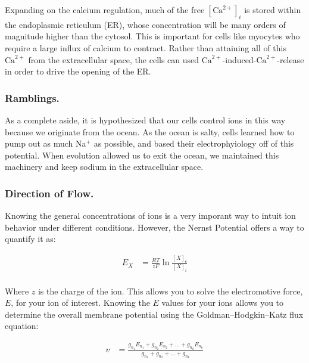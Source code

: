 Expanding on the calcium regulation, much of the free $[\mathrm{Ca}^{2+}]_i$ is stored within the endoplasmic reticulum (ER), whose concentration will be many orders of magnitude higher than the cytosol. This is important for cells like myocytes who require a large influx of calcium to contract. Rather than attaining all of this $\mathrm{Ca}^{2+}$ from the extracellular space, the cells can used $\mathrm{Ca}^{2+}$-induced-$\mathrm{Ca}^{2+}$-release in order to drive the opening of the ER.

\subsubsection{Ramblings.}

As a complete aside, it is hypothesized that our cells control ions in this way because we originate from the ocean. As the ocean is salty, cells learned how to pump out as much Na$^+$ as possible, and based their electrophyiology off of this potential. When evolution allowed us to exit the ocean, we maintained this machinery and keep sodium in the extracellular space. 

\subsubsection{Direction of Flow.}

Knowing the general concentrations of ions is a very imporant way to intuit ion behavior under different conditions. However, the Nernst Potential offers a way to quantify it as: 

\begin{equation} \label{Nernst1}
\begin{split}
E_X &= \frac{RT}{zF}\ln\frac{[X]_e}{[X]_i}\\
\end{split}
\end{equation}

Where $z$ is the charge of the ion. This allows you to solve the electromotive force, $E$, for your ion of interest. Knowing the $E$ values for your ions allows you to determine the overall membrane potential using the Goldman–Hodgkin–Katz flux equation:

\begin{equation} \label{GHK}
\begin{split}
v &= \frac{g_{n_1}E_{n_1} + g_{n_2}E_{n_2} + ... + g_{n_k}E_{n_k}}{g_{n_1} + g_{n_2} + ... + g_{n_k}}
\end{split}
\end{equation}

